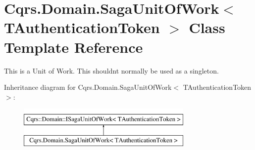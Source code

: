 \hypertarget{classCqrs_1_1Domain_1_1SagaUnitOfWork}{}\section{Cqrs.\+Domain.\+Saga\+Unit\+Of\+Work$<$ T\+Authentication\+Token $>$ Class Template Reference}
\label{classCqrs_1_1Domain_1_1SagaUnitOfWork}


This is a Unit of Work. This shouldn\textquotesingle{}t normally be used as a singleton.  


Inheritance diagram for Cqrs.\+Domain.\+Saga\+Unit\+Of\+Work$<$ T\+Authentication\+Token $>$\+:\begin{figure}[H]
\begin{center}
\leavevmode
\includegraphics[height=2.000000cm]{classCqrs_1_1Domain_1_1SagaUnitOfWork}
\end{center}
\end{figure}
